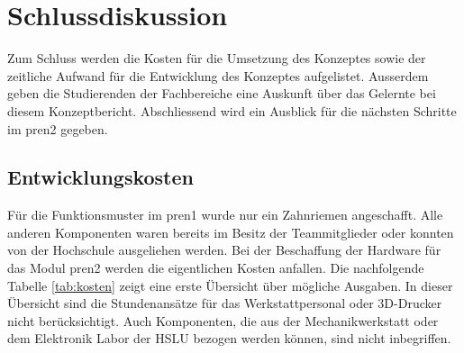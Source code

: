 \newpage
\section{Schlussdiskussion}
Zum Schluss werden die Kosten für die Umsetzung des Konzeptes sowie der zeitliche Aufwand für die Entwicklung des Konzeptes aufgelistet. Ausserdem geben die Studierenden der Fachbereiche eine Auskunft über das Gelernte bei diesem Konzeptbericht. Abschliessend wird ein Ausblick für die nächsten Schritte im \acrshort{pren2} gegeben.
\subsection{Entwicklungskosten}
Für die Funktionsmuster im \acrshort{pren1} wurde nur ein Zahnriemen angeschafft. Alle anderen Komponenten waren bereits im Besitz der Teammitglieder oder konnten von der Hochschule ausgeliehen werden. Bei der Beschaffung der Hardware für das Modul \acrshort{pren2} werden die eigentlichen Kosten anfallen. Die nachfolgende Tabelle \ref{tab:kosten} zeigt eine erste Übersicht über mögliche Ausgaben. In dieser Übersicht sind die Stundenansätze für das Werkstattpersonal oder 3D-Drucker nicht berücksichtigt. Auch Komponenten, die aus der Mechanikwerkstatt oder dem Elektronik Labor der HSLU bezogen werden können, sind nicht inbegriffen.

